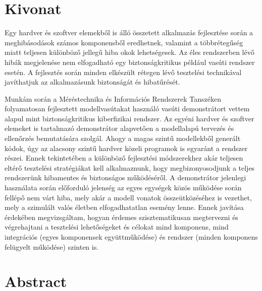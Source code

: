 \setcounter{page}{1}

\selecthungarian

\chapter*{Kivonat}

Egy hardver és szoftver elemekből is álló összetett alkalmazás fejlesztése során a meghibásodások számos komponensből eredhetnek, valamint a többrétegűség miatt teljesen különböző jellegű hiba okok lehetségesek. Az éles rendszerben lévő hibák megjelenése nem elfogadható egy biztonságkritikus például vasúti rendszer esetén. A fejlesztés során minden elkészült rétegen lévő tesztelési technikával javíthatjuk az alkalmazásunk biztonságát és hibatűrését.

Munkám során a Méréstechnika és Információs Rendszerek Tanszéken folyamatosan fejlesztett modellvasútakat használó vasúti demonstrátort vettem alapul mint biztonságkritikus kiberfizikai rendszer. Az egyéni hardver és szoftver elemeket is tartalmazó demonstrátor alapvetően a modellalapú tervezés és ellenőrzés bemutatására szolgál. Ahogy a magas szintű modellekből generált kódok, úgy az alacsony szintű hardver közeli programok is egyaránt a rendszer részei. Ennek tekintetében a különböző fejlesztési módszerekhez akár teljesen eltérő tesztelési stratégiákat kell alkalmaznunk, hogy megbizonyosodjunk a teljes rendszerünk hibamentes és biztonságos működéséről. A demonstrátor jelenlegi használata során előforduló jelenség az egyes egységek közös működése során fellépő nem várt hiba, mely akár a modell vonatok összeütközéséhez is vezethet, mely a szimulált valós életben elfogadhatatlan esemény lenne. Ennek javítása érdekében megvizsgáltam, hogyan érdemes szisztematikusan megtervezni és végrehajtani a tesztelési lehetőségeket és célokat mind komponens, mind integrációs (egyes komponensek együttműködése)  és rendszer (minden komponens felügyelt működése) szinten is.

\vfill
\selectenglish


\chapter*{Abstract}

